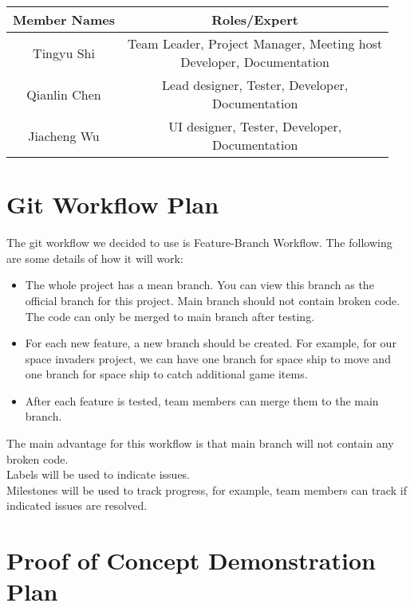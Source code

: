 \documentclass[12pt]{article}
\begin{document}
\begin{table}[h]
    \centering
    \begin{tabular}{|c|c|}
    \hline
         Member Names & Roles/Expert  \\
         \hline
         Tingyu Shi & \shortstack{ Team Leader, Project Manager, Meeting host \\ Developer, Documentation }\\
         \hline
         Qianlin Chen & \shortstack{ Lead designer, Tester, Developer, \\ Documentation}\\
         \hline
         Jiacheng Wu & \shortstack{UI designer, Tester, Developer, \\ Documentation} \\
         \hline
    \end{tabular}
    \label{tab:label1}
\end{table}

\section{Git Workflow Plan}
The git workflow we decided to use is Feature-Branch Workflow. The following are
some details of how it will work:
\begin{itemize}
\item The whole project has a mean branch. 
You can view this branch as the official 
branch for this project. Main branch should
not contain broken code. The code can only
be merged to main branch after testing.
\item For each new feature, a new branch 
should be created. For example, for our space invaders project, we can have one 
branch for space ship to move and one
branch for space ship to catch additional
game items.
\item After each feature is tested, team 
members can merge them to the main branch.
\end{itemize}
The main advantage for this workflow is that 
main branch will not contain any broken code.\\
Labels will be used to indicate issues.\\
Milestones will be used to track progress,
for example, team members can track if 
indicated issues are resolved.
\section{Proof of Concept Demonstration Plan}
\end{document}
